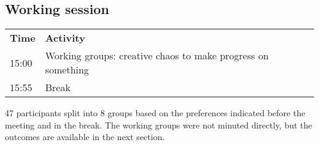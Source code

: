 \subsection{Working session}

\begin{table}[!h]
    \centering
    \begin{tabular}{@{}|p{}|p{}|@{}}
    \rowcolor{Task32Blue2} \textbf{Time} & \textbf{Activity} \\    
    15:00 & Working groups: creative chaos to make progress on something \\
    15:55 & Break
    \end{tabular}
    \label{tab:day2-workingsession-agenda}
\end{table}

47 participants split into 8 groups based on the preferences indicated before the meeting and in the break. The working groups were not minuted directly, but the outcomes are available in the next section.
